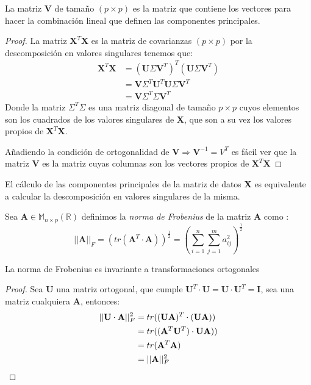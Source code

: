 \begin{propo}
La matriz \textbf{V} de tamaño $(p\times p)$ es la matriz que contiene los vectores para hacer la combinación lineal que definen las componentes principales.
\begin{proof}
La matriz $\textbf{X}^T \textbf{X}$ es la matriz de covarianzas $(p \times p)$  por la descomposición en valores singulares tenemos que:
\begin{align*}
\textbf{X}^T \textbf{X} &= (\textbf{U}\Sigma \textbf{V}^T)^T (\textbf{U}\Sigma \textbf{V}^T)\\
&= \textbf{V}\Sigma ^T \textbf{U}^T \textbf{U}\Sigma \textbf{V}^T\\
&= \textbf{V}\Sigma ^T \Sigma \textbf{V}^T
\end{align*}
Donde la matriz $\Sigma ^T \Sigma $ es una matriz diagonal de tamaño $p \times p $ cuyos elementos son los cuadrados de los valores singulares de \textbf{X}, que son a su vez los valores propios de $\textbf{X}^T \textbf{X}$. 

\noindent Añadiendo la condición de ortogonalidad de $\textbf{V}\Rightarrow \textbf{V}^{-1}=V^T$ es fácil ver que la matriz \textbf{V} es la matriz cuyas columnas son los vectores propios de $\textbf{X}^T\textbf{X}$
\end{proof}
\end{propo}

\begin{coro}
El cálculo de las componentes principales de la matriz de datos \textbf{X} es equivalente a calcular la descomposición en valores singulares de la misma. 
\end {coro}
\newpage
\begin{defi}
Sea $\textbf{A}\in \mathbb{M}_{n\times p}(\mathbb{R})$ definimos la \textit{norma de Frobenius} de la matriz \textbf{A} como :
\begin{equation}
||\textbf{A}||_F=(tr(\textbf{A}^T\cdot \textbf{A}))^{\frac{1}{2}}=\left(\sum_{i=1}^{n}\sum _{j=1}^{m}a_{ij}^2\right)^{\frac{1}{2}}
\end{equation}
\end{defi}

\begin{propo}
La norma de Frobenius es invariante a transformaciones ortogonales
\begin{proof}
Sea $\mathbf{U}$ una matriz ortogonal, que cumple $\mathbf{U}^T\cdot \mathbf{U}=\mathbf{U}\cdot \mathbf{U}^T=\textbf{I}$, sea una matriz cualquiera $\mathbf{A}$, entonces:
\begin{align*}
||\mathbf{U} \cdot \mathbf{A}||_F^2&=tr((\mathbf{U} \mathbf{A})^T\cdot(\mathbf{U} \mathbf{A}))\\
&=tr((\mathbf{A}^T \mathbf{U}^T)\cdot \mathbf{U} \mathbf{A}))\\
&=tr(\mathbf{A}^T \mathbf{A})\\
&=||\mathbf{A}||_F^2\qedhere
\end{align*}
\end{proof}
\end{propo}

